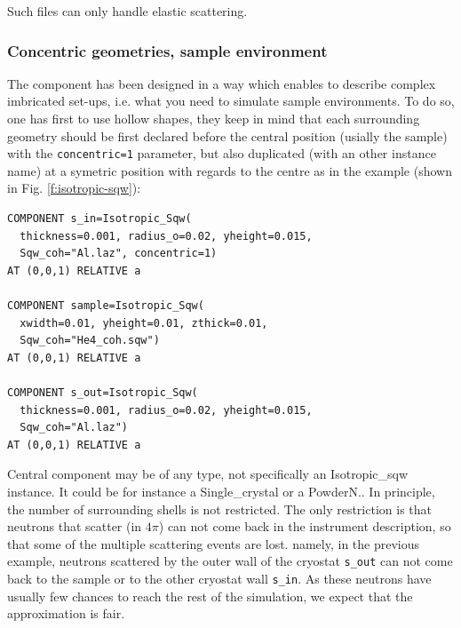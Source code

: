 Such files can only handle elastic scattering.

\subsubsection{Concentric geometries, sample environment}

The component has been designed in a way which enables to describe complex imbricated set-ups, i.e. what you need to simulate sample environments. To do so, one has first to use hollow shapes, they keep in mind that each surrounding geometry should be first declared before the central position (usially the sample) with the \verb+concentric=1+ parameter, but also duplicated (with an other instance name) at a symetric position with regards to the centre as in the example (shown in Fig. \ref{f:isotropic-sqw}):
\begin{verbatim}
COMPONENT s_in=Isotropic_Sqw(
  thickness=0.001, radius_o=0.02, yheight=0.015,
  Sqw_coh="Al.laz", concentric=1)
AT (0,0,1) RELATIVE a

COMPONENT sample=Isotropic_Sqw(
  xwidth=0.01, yheight=0.01, zthick=0.01,
  Sqw_coh="He4_coh.sqw")
AT (0,0,1) RELATIVE a

COMPONENT s_out=Isotropic_Sqw(
  thickness=0.001, radius_o=0.02, yheight=0.015,
  Sqw_coh="Al.laz")
AT (0,0,1) RELATIVE a
\end{verbatim}
Central component may be of any type, not specifically an Isotropic\_sqw instance. It could be for instance a Single\_crystal or a PowderN..
In principle, the number of surrounding shells is not restricted.
The only restriction is that neutrons that scatter (in $4\pi$) can not come back in the instrument description, so that some of the multiple scattering events are lost. namely, in the previous example, neutrons scattered by the outer wall of the cryostat \verb+s_out+ can not come back to the sample or to the other cryostat wall \verb+s_in+. As these neutrons have usually few chances to reach the rest of the simulation, we expect that the approximation is fair.



